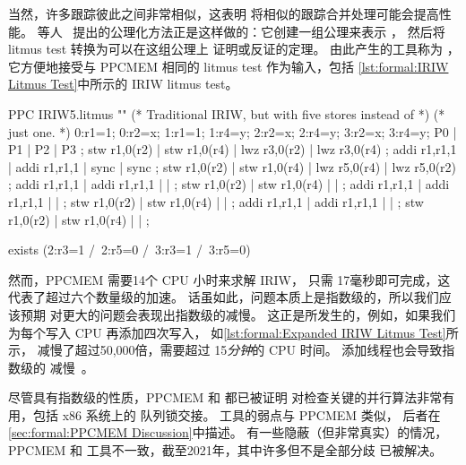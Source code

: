 当然，许多跟踪彼此之间非常相似，这表明
将相似的跟踪合并处理可能会提高性能。
等人~\cite{Alglave:2014:HCM:2594291.2594347}
提出的公理化方法正是这样做的：它创建一组公理来表示 ，
然后将 litmus test 转换为可以在这组公理上
证明或反证的定理。
由此产生的工具称为 ，它方便地接受与 PPCMEM
相同的 litmus test 作为输入，包括
\cref{lst:formal:IRIW Litmus Test}中所示的 IRIW litmus test。

\begin{listing}
\begin{fcvlabel}
\begin{VerbatimL}[commandchars=\%\@\$]
PPC IRIW5.litmus
""
(* Traditional IRIW, but with five stores instead of *)
(* just one.                                         *)
{
0:r1=1; 0:r2=x;
1:r1=1;         1:r4=y;
        2:r2=x; 2:r4=y;
        3:r2=x; 3:r4=y;
}
P0           | P1           | P2           | P3           ;
stw r1,0(r2) | stw r1,0(r4) | lwz r3,0(r2) | lwz r3,0(r4) ;
addi r1,r1,1 | addi r1,r1,1 | sync         | sync         ;
stw r1,0(r2) | stw r1,0(r4) | lwz r5,0(r4) | lwz r5,0(r2) ;
addi r1,r1,1 | addi r1,r1,1 |              |              ;
stw r1,0(r2) | stw r1,0(r4) |              |              ;
addi r1,r1,1 | addi r1,r1,1 |              |              ;
stw r1,0(r2) | stw r1,0(r4) |              |              ;
addi r1,r1,1 | addi r1,r1,1 |              |              ;
stw r1,0(r2) | stw r1,0(r4) |              |              ;

exists
(2:r3=1 /\ 2:r5=0 /\ 3:r3=1 /\ 3:r5=0)
\end{VerbatimL}
\end{fcvlabel}
\caption{扩展的 IRIW Litmus Test}
\label{lst:formal:Expanded IRIW Litmus Test}
\end{listing}

然而，PPCMEM 需要14个 CPU 小时来求解 IRIW， 只需
17毫秒即可完成，这代表了超过六个数量级的加速。
话虽如此，问题本质上是指数级的，所以我们应该预期
 对更大的问题会表现出指数级的减慢。
这正是所发生的，例如，如果我们为每个写入 CPU 再添加四次写入，
如\cref{lst:formal:Expanded IRIW Litmus Test}所示，
 减慢了超过50,000倍，需要超过
15\emph{分钟}的 CPU 时间。
添加线程也会导致指数级的
减慢~\cite{PaulEMcKenney2014weakaxiom}。

尽管具有指数级的性质，PPCMEM 和  都已被证明
对检查关键的并行算法非常有用，包括 x86 系统上的
队列锁交接。
 工具的弱点与 PPCMEM 类似，
后者在\cref{sec:formal:PPCMEM Discussion}中描述。
有一些隐蔽（但非常真实）的情况，PPCMEM 和
 工具不一致，截至2021年，其中许多但不是全部分歧
已被解决。

